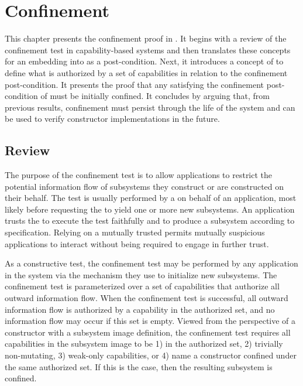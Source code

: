 \chapter{Confinement}
\label{ch:confinement}

This chapter presents the confinement proof in \TMmodelName{}.
It begins with a review of the confinement test in capability-based systems and then translates these concepts for an embedding into \TMmodelName{} as a post-condition.
Next, it introduces a concept of \term{\TMagFullyAuthorized} to define what is authorized by a set of capabilities in relation to the confinement post-condition.
It presents the proof that any \TMsubsystem{} satisfying the confinement post-condition of \TMmodelName{} must be initially confined.
It concludes by arguing that, from previous results, confinement must persist through the life of the system and can be used to verify constructor implementations in the future.

\section{Review}

The purpose of the confinement test is to allow applications to restrict the potential information flow of subsystems they construct or are constructed on their behalf.
The test is usually performed by a \term{\TMconstructor{}} on behalf of an application, most likely before requesting the \TMconstructor{} to yield one or more new subsystems.
An application trusts the \TMconstructor{} to execute the test faithfully and to produce a subsystem according to specification.
Relying on a mutually trusted \TMconstructor{} permits mutually suspicious applications to interact without being required to engage in further trust.

As a constructive test, the confinement test may be performed by any application in the system via the mechanism they use to initialize new subsystems.
The confinement test is parameterized over a set of capabilities that authorize all outward information flow.
When the confinement test is successful, all outward information flow is authorized by a capability in the authorized set, and no information flow may occur if this set is empty.
Viewed from the perspective of a constructor with a subsystem image definition, the confinement test requires all capabilities in the subsystem image to be 1) in the authorized set, 2) trivially non-mutating, 3) weak-only capabilities, or 4) name a constructor confined under the same authorized set.
If this is the case, then the resulting subsystem is confined.


